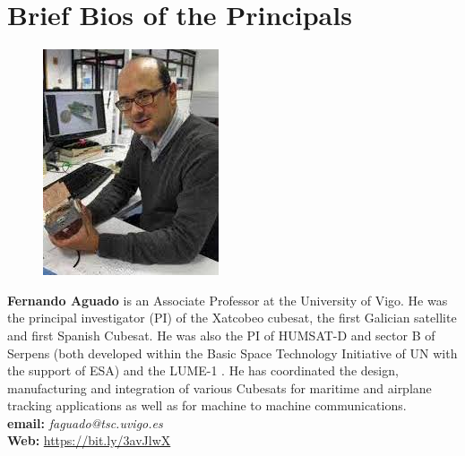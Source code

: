 \documentclass[12pt]{article}
\begin{document}
\newpage
\vspace*{0.5cm}
\section{Brief Bios of the Principals}



\parbox{6.25in}{
\begin{figure}
  \centering
  \includegraphics[width=.75\linewidth]{fig/FAguado.jpg}
\end{figure}
\textbf{Fernando Aguado} is an Associate Professor at the University
of Vigo. He was the principal investigator (PI) of the Xatcobeo
cubesat, the first Galician satellite and first Spanish Cubesat. He
was also the PI of HUMSAT-D and sector B of Serpens (both developed
within the Basic Space Technology Initiative of UN with the support of
ESA) and the LUME-1 \smle. He has coordinated the design, manufacturing
and integration of various Cubesats for maritime and airplane tracking
applications as well as for machine to machine communications.
\\
\textbf{email: }\emph{faguado@tsc.uvigo.es} \\
\textbf{Web: }\url{https://bit.ly/3avJlwX}\\
}

\end{document}
